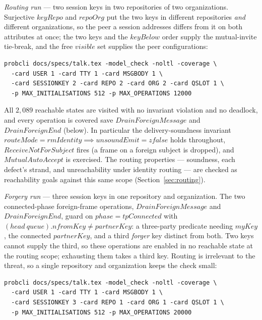 \documentclass[a4paper,10pt,fleqn]{article}
\begin{document}
\emph{Routing run} --- two session keys in two repositories of two
organizations.  Surjective $keyRepo$ and $repoOrg$ put the two keys in
different repositories \emph{and} different organizations, so the peer a
session addresses differs from it on both attributes at once; the two
keys and the $keyBelow$ order supply the mutual-invite tie-break, and the
free $visible$ set supplies the peer configurations:

\begin{verbatim}
probcli docs/specs/talk.tex -model_check -noltl -coverage \
  -card USER 1 -card TTY 1 -card MSGBODY 1 \
  -card SESSIONKEY 2 -card REPO 2 -card ORG 2 -card QSLOT 1 \
  -p MAX_INITIALISATIONS 512 -p MAX_OPERATIONS 12000
\end{verbatim}

All $2{,}089$ reachable states are visited with no invariant violation
and no deadlock, and every operation is covered save $DrainForeignMessage$
and $DrainForeignEnd$ (below).  In particular the delivery-soundness
invariant $routeMode = rmIdentity \implies unsoundEmit = zfalse$ holds
throughout, $ReceiveNotForSubject$ fires (a frame on a foreign subject is
dropped), and $MutualAutoAccept$ is exercised.  The routing properties ---
soundness, each defect's strand, and unreachability under identity
routing --- are checked as reachability goals against this same scope
(Section~\ref{sec:routing}).

\emph{Forgery run} --- three session keys in one repository and
organization.  The two connected-phase foreign-frame operations,
$DrainForeignMessage$ and $DrainForeignEnd$, guard on $phase =
tpConnected$ with $(head~queue).nfromKey \neq partnerKey$: a three-party
predicate needing $myKey$, the connected $partnerKey$, and a third
\emph{forger} key distinct from both.  Two keys cannot supply the third,
so these operations are enabled in no reachable state at the routing
scope; exhausting them takes a third key.  Routing is irrelevant to the
threat, so a single repository and organization keeps the check small:

\begin{verbatim}
probcli docs/specs/talk.tex -model_check -noltl -coverage \
  -card USER 1 -card TTY 1 -card MSGBODY 1 \
  -card SESSIONKEY 3 -card REPO 1 -card ORG 1 -card QSLOT 1 \
  -p MAX_INITIALISATIONS 512 -p MAX_OPERATIONS 20000
\end{verbatim}
\end{document}
